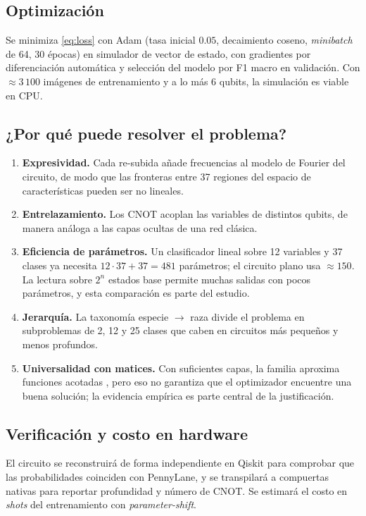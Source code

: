 \documentclass[11pt,letterpaper]{article}
\begin{document}
\subsection{Optimización}
Se minimiza \eqref{eq:loss} con Adam (tasa inicial $0.05$, decaimiento coseno, \emph{minibatch} de
64, 30 épocas) en simulador de vector de estado, con gradientes por diferenciación automática y
selección del modelo por F1 macro en validación. Con $\approx3\,100$ imágenes de entrenamiento y a lo
más 6 qubits, la simulación es viable en CPU.

\subsection{¿Por qué puede resolver el problema?}
\begin{enumerate}[leftmargin=*]
\item \textbf{Expresividad.} Cada re-subida añade frecuencias al modelo de Fourier del circuito, de
modo que las fronteras entre 37 regiones del espacio de características pueden ser no lineales.
\item \textbf{Entrelazamiento.} Los CNOT acoplan las variables de distintos qubits, de manera análoga a
las capas ocultas de una red clásica.
\item \textbf{Eficiencia de parámetros.} Un clasificador lineal sobre 12 variables y 37 clases ya
necesita $12\cdot37+37=481$ parámetros; el circuito plano usa $\approx150$. La lectura sobre $2^n$
estados base permite muchas salidas con pocos parámetros, y esta comparación es parte del estudio.
\item \textbf{Jerarquía.} La taxonomía especie $\to$ raza divide el problema en subproblemas de 2, 12 y
25 clases que caben en circuitos más pequeños y menos profundos.
\item \textbf{Universalidad con matices.} Con suficientes capas, la familia aproxima funciones acotadas
\cite{perez2020}, pero eso no garantiza que el optimizador encuentre una buena solución; la evidencia
empírica es parte central de la justificación.
\end{enumerate}

\subsection{Verificación y costo en hardware}
El circuito se reconstruirá de forma independiente en Qiskit para comprobar que las probabilidades
coinciden con PennyLane, y se transpilará a compuertas nativas para reportar profundidad y número de
CNOT. Se estimará el costo en \emph{shots} del entrenamiento con \emph{parameter-shift}.
\end{document}
